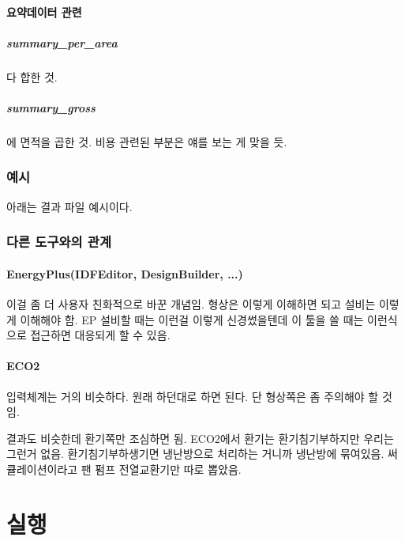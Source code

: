 \subsubsection{요약데이터 관련}
\paragraph{summary\_per\_area} 다 합한 것.
\paragraph{summary\_gross} 에 면적을 곱한 것. 비용 관련된 부분은 얘를 보는 게 맞을 듯.

\subsection{예시}

아래는 결과 파일 예시이다.

\subsection{다른 도구와의 관계}
\subsubsection{EnergyPlus(IDFEditor, DesignBuilder, ...)}
이걸 좀 더 사용자 친화적으로 바꾼 개념임. 형상은 이렇게 이해하면 되고 설비는 이렇게 이해해야 함. EP 설비할 때는 이런걸 이렇게 신경썼을텐데 이 툴을 쓸 때는 이런식으로 접근하면 대응되게 할 수 있음.

\subsubsection{ECO2}
입력체계는 거의 비슷하다. 원래 하던대로 하면 된다. 단 형상쪽은 좀 주의해야 할 것임. \par
결과도 비슷한데 환기쪽만 조심하면 됨. ECO2에서 환기는 환기침기부하지만 우리는 그런거 없음. 환기침기부하생기면 냉난방으로 처리하는 거니까 냉난방에 묶여있음. 써큘레이션이라고 팬 펌프 전열교환기만 따로 뽑았음.




\chapter{실행}


